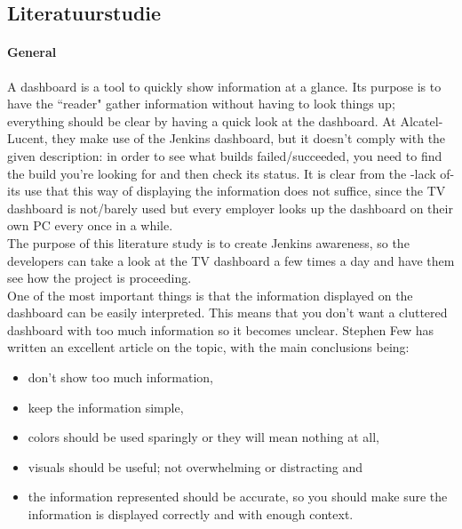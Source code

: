 \documentclass[10pt,a4paper]{article}
\begin{document}
\clearpage



\begin{appendices}
\section{Literatuurstudie}
\label{lit_study}


\paragraph{General}
A dashboard is a tool to quickly show information at a glance. Its purpose is to have the ``reader" gather information without having to look things up; everything should be clear by having a quick look at the dashboard. At Alcatel-Lucent, they make use of the Jenkins dashboard, but it doesn't comply with the given description: in order to see what builds failed/succeeded, you need to find the build you're looking for and then check its status. It is clear from the -lack of- its use that this way of displaying the information does not suffice, since the TV dashboard is not/barely used but every employer looks up the dashboard on their own PC every once in a while. \\

The purpose of this literature study is to create Jenkins awareness, so the developers can take a look at the TV dashboard a few times a day and have them see how the project is proceeding.\\
One of the most important things is that the information displayed on the dashboard can be easily interpreted. This means that you don't want a cluttered dashboard with too much information so it becomes unclear.
Stephen Few has written an excellent article on the topic, with the main conclusions being:
\begin{itemize}
\item don't show too much information,
\item keep the information simple,
\item colors should be used sparingly or they will mean nothing at all,
\item visuals should be useful; not overwhelming or distracting and
\item the information represented should be accurate, so you should make sure the information is displayed correctly and with enough context.
\end{itemize}
 

\end{appendices}
\end{document}
